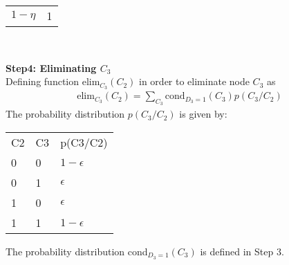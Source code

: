 \documentclass[12pt]{article}
\begin{document}
\begin{enumerate}[label=(\alph*)]
\begin{center}
\begin{tabular}{ll}
  $1-\eta$               & 1       \\
  \end{tabular} \newline \\
  \end{center}
  \textbf{Step4: Eliminating $C_3$} \\
  Defining function elim$_{C_3}(C_2)$ in order to eliminate node $C_3$ as
  \begin{align*}
  \text{elim}_{C_3}(C_2) = \sum_{C_3} \text{cond}_{D_3 = 1}(C_3) p(C_3/C_2)
  \end{align*}
  The probability distribution $p(C_3/C_2)$ is given by:
  \begin{center}
  \begin{tabular}{lll}
  C2 & C3 & p(C3/C2)    \\
  0  & 0  & $1 - \epsilon$  \\
  0  & 1  & $\epsilon$      \\
  1  & 0  & $\epsilon$      \\
  1  & 1  & $1 - \epsilon$
  \end{tabular}
  \end{center}
  The probability distribution cond$_{D_3 = 1}(C_3)$ is defined in Step 3.
  

\end{enumerate}
\end{document}
